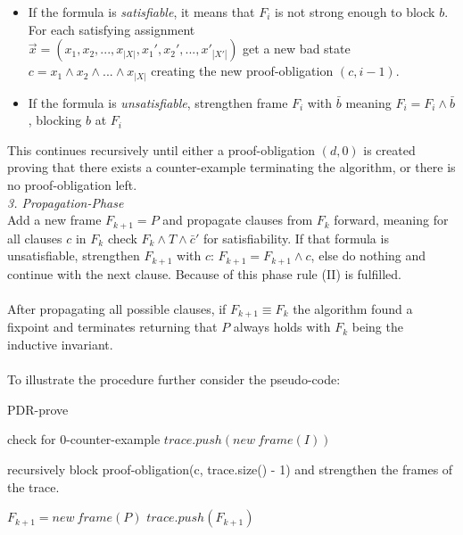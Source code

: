 \documentclass[11pt, a4paper, BCOR=10mm, ngerman, oneside]{scrbook}
\begin{document}
\begin{itemize}
\item If the formula is \textsl{satisfiable}, it means that $F_{i}$ is not strong enough to block $b$. For each satisfying assignment \\ $\vec{x} = (x_1, x_2, ..., x_{|X|}, x_1', x_2', ..., x'_{|X'|})$ get a new bad state \\ $c = x_1 \land x_2 \land ... \land x_{|X|}$ creating the new proof-obligation $(c, i-1)$.

\item If the formula is \textsl{unsatisfiable}, strengthen frame $F_{i}$ with $\bar b$ meaning $F_i = F_i \land \bar b$, blocking $b$ at $F_{i}$ 

\end{itemize}

This continues recursively until either a proof-obligation $(d, 0)$ is created proving that there exists a counter-example terminating the algorithm, or
there is no proof-obligation left. \\

\textsl{3. Propagation-Phase}\\ Add a new frame $F_{k + 1} = P$ and propagate clauses from $F_{k}$ forward, meaning for all clauses $c$ in $F_{k}$ check $F_{k} \land T \land \bar c'$ for satisfiability. If that formula is unsatisfiable, strengthen $F_{k+1}$ with $c$: $F_{k+1} = F_{k+1} \land c$, else do nothing and continue with the next clause. Because of this phase rule (II) is fulfilled.\\ \\
After propagating all possible clauses, if $F_{k+1} \equiv F_{k}$ the algorithm found a fixpoint and terminates returning that $P$ always holds with $F_k$ being the inductive invariant. \\ \\

To illustrate the procedure further consider the pseudo-code: \\

\begin{algorithm}[H] 
\caption{PDR-prove}
\begin{algorithmic}[1]
\State check for 0-counter-example
\State $trace.push(new\ frame(I))$
\Statex
\Loop

	\State recursively block proof-obligation(c, trace.size() - 1)
	\State and strengthen the frames of the trace.
	
	 
	\EndIf
	\EndWhile

	\Statex	
	
	\State $F_{k+1} = new\ frame(P)$
	\EndIf
\EndFor
	\EndIf
	\State $trace.push(F_{k+1})$

\EndLoop
\EndProcedure
\end{algorithmic}
\end{algorithm}
\end{document}
